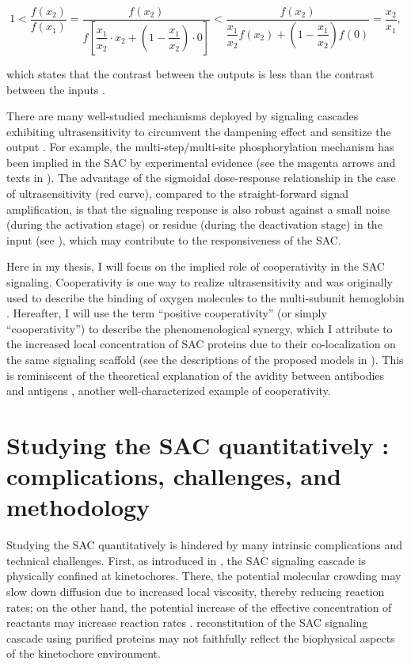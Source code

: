 \begin{equation*}
    1 < \dfrac{f(x_2)}{f(x_1)} = \dfrac{f(x_2)}{f[\dfrac{x_1}{x_2} \cdot x_2 + (1-\dfrac{x_1}{x_2}) \cdot 0]} < \dfrac{f(x_2)}{\dfrac{x_1}{x_2}f(x_2) + (1-\dfrac{x_1}{x_2})f(0)} = \dfrac{x_2}{x_1},
\end{equation*}

\noindent which states that the contrast between the outputs is less than the contrast between the inputs \cite{InhibitorUltrasensitivity}.

There are many well-studied mechanisms deployed by signaling cascades exhibiting ultrasensitivity to circumvent the dampening effect and sensitize the output \cite{ZeroOrder, MultistepUltrasensitivity, Bistability}. For example, the multi-step/multi-site phosphorylation mechanism has been implied in the SAC by experimental evidence \cite{Ji2017eLife} (see the magenta arrows and texts in ). The advantage of the sigmoidal dose-response relationship in the case of ultrasensitivity (red curve), compared to the straight-forward signal amplification, is that the signaling response is also robust against a small noise (during the activation stage) or residue (during the deactivation stage) in the input (see ), which may contribute to the responsiveness of the SAC.

Here in my thesis, I will focus on the implied role of cooperativity in the SAC signaling. Cooperativity is one way to realize ultrasensitivity and was originally used to describe the binding of oxygen molecules to the multi-subunit hemoglobin \cite{KNF, MWC}. Hereafter, I will use the term ``positive cooperativity'' (or simply ``cooperativity'') to describe the phenomenological synergy, which I attribute to the increased local concentration of SAC proteins due to their co-localization on the same signaling scaffold (see the descriptions of the proposed models in ). This is reminiscent of the theoretical explanation of the avidity between antibodies and antigens \cite{AvidityMath}, another well-characterized example of cooperativity.

\section{Studying the SAC quantitatively : complications, challenges, and methodology}
\label{TechnicalChallenges}

Studying the SAC quantitatively  is hindered by many intrinsic complications and technical challenges. First, as introduced in , the SAC signaling cascade is physically confined at kinetochores. There, the potential molecular crowding may slow down diffusion due to increased local viscosity, thereby reducing reaction rates; on the other hand, the potential increase of the effective concentration of reactants may increase reaction rates \cite{MolecularCrowding}.  reconstitution of the SAC signaling cascade using purified proteins may not faithfully reflect the biophysical aspects of the kinetochore environment.

